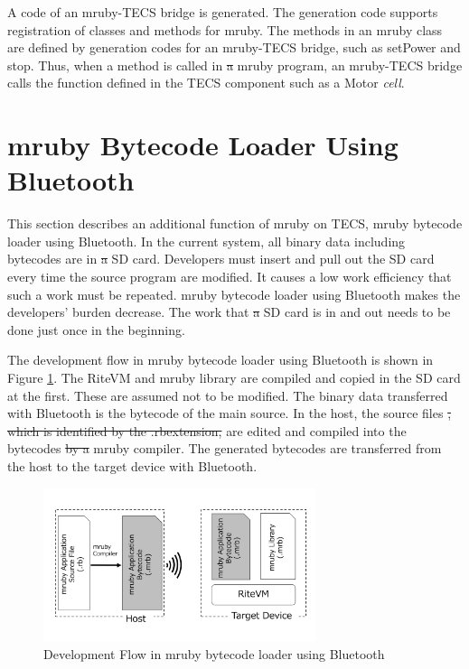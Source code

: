 \documentclass[conference,compsoc]{IEEEtran}
\providecommand{\DIFadd}[1]{{\protect\color{blue}\uwave{#1}}} %
\providecommand{\DIFdel}[1]{{\protect\color{red}\sout{#1}}}                      %
\providecommand{\DIFaddbegin}{} %
\providecommand{\DIFaddend}{} %
\providecommand{\DIFdelbegin}{} %
\providecommand{\DIFdelend}{} %
\begin{document}
A code of an mruby-TECS bridge is generated.
The generation code supports registration of classes and methods for mruby.
The methods in an mruby class are defined by generation codes for an mruby-TECS bridge, such as setPower and stop.
Thus, when a method is called in \DIFdelbegin \DIFdel{a }\DIFdelend \DIFaddbegin \DIFadd{an }\DIFaddend mruby program, an mruby-TECS bridge calls the function defined in the TECS component such as a Motor {\it cell}.


\section{mruby Bytecode Loader Using Bluetooth}
\label{sec:mruby bytecode loader using Bluetooth}
This section describes an additional function of mruby on TECS, mruby bytecode loader using Bluetooth.
In the current system, all binary data including bytecodes are in \DIFdelbegin \DIFdel{a }\DIFdelend \DIFaddbegin \DIFadd{an }\DIFaddend SD card.
Developers must insert and pull out the SD card every time the source program are modified.
It causes a low work efficiency that such a work must be repeated.
mruby bytecode loader using Bluetooth makes the developers' burden decrease.
The work that \DIFdelbegin \DIFdel{a }\DIFdelend \DIFaddbegin \DIFadd{an }\DIFaddend SD card is in and out needs to be done just once in the beginning.

The development flow in mruby bytecode loader using Bluetooth is shown in Figure \ref{fig:bluetooth_loader}.
The RiteVM and mruby library are compiled and copied in the SD card at the first.
These are assumed not to be modified.
The binary data transferred with Bluetooth is the bytecode of the main source.
In the host, the source files \DIFdelbegin \DIFdel{, which is identified by the .rbextension, }\DIFdelend \DIFaddbegin \DIFadd{(.rb) }\DIFaddend are edited and compiled into the bytecodes \DIFdelbegin \DIFdel{by a }\DIFdelend \DIFaddbegin \DIFadd{(.mrb) by an }\DIFaddend mruby compiler.
The generated bytecodes are transferred from the host to the target device with Bluetooth.

\begin{figure}[t]
    \centering
    \includegraphics[width=8cm,clip]{figure/bluetooth_loader.pdf}
    \caption{Development Flow in mruby bytecode loader using Bluetooth}
    \label{fig:bluetooth_loader}
\end{figure}
\end{document}
